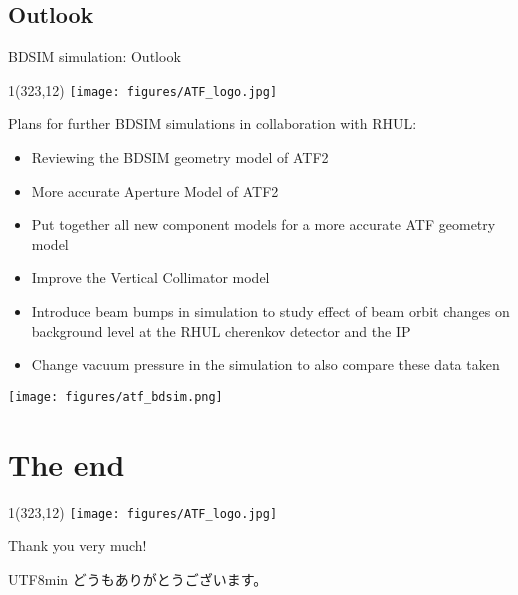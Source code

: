 \documentclass[xcolor={dvipsnames}]{beamer}
\newcommand{\ATFlogo}{
  \setlength{\TPHorizModule}{1pt}
  \setlength{\TPVertModule}{1pt}
  \begin{textblock}{1}(323,12)
   \texttt{[image: figures/ATF\_logo.jpg]}
  \end{textblock}
}
\begin{document}
\subsection{Outlook}
\begin{frame}{BDSIM simulation: Outlook}
\ATFlogo
Plans for further BDSIM simulations in collaboration with RHUL:\\
\begin{itemize}
 \item Reviewing the BDSIM geometry model of ATF2
 \item More accurate Aperture Model of ATF2
 \item Put together all new component models for a more accurate ATF geometry model
 \item Improve the Vertical Collimator model
 \item Introduce beam bumps in simulation to study effect of beam orbit changes on background level at the RHUL cherenkov detector and the IP
 \item Change vacuum pressure in the simulation to also compare these data taken
\end{itemize}

\begin{center}
  \texttt{[image: figures/atf\_bdsim.png]}\\
\end{center}

\end{frame}



\section*{The end}
{
\begin{frame}
\ATFlogo
\begin{center}
\textcolor{RubineRed}{
	\LARGE Thank you very much!\\
	\vspace*{0.5cm}
	\begin{CJK}{UTF8}{min}
	どうもありがとうございます。
	\end{CJK}
}
\end{center}
\end{frame}
}
\end{document}
